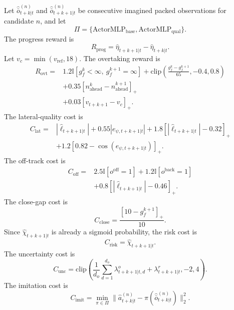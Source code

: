 \documentclass[journal]{IEEEtran}
\begin{document}
Let $\hat{\bar{o}}_{t+k|t}^{(n)}$ and
$\hat{\bar{o}}_{t+k+1|t}^{(n)}$ be consecutive imagined packed
observations for candidate $n$, and let
\begin{equation}
\Pi=
\{
\mathrm{ActorMLP}_{\mathrm{base}},
\mathrm{ActorMLP}_{\mathrm{qual}}
\}.
\end{equation}
The progress reward is
\begin{equation}
R_{\mathrm{prog}}
=
\hat{\eta}_{t+k+1|t}
-
\hat{\eta}_{t+k|t}.
\end{equation}
Let $v_c=\min(v_{\mathrm{ref}},18)$. The overtaking reward is
{\small
\begin{equation}
\begin{aligned}
R_{\mathrm{ovt}}
=
&
1.2
\mathbb{I}[g_f^k<\infty,\ g_f^{k+1}=\infty]
+
\mathrm{clip}
\left(
\frac{g_f^k-g_f^{k+1}}{65},
-0.4,
0.8
\right)
\\
&
+
0.35[n_{\mathrm{ahead}}^k-n_{\mathrm{ahead}}^{k+1}]_+
\\
&
+
0.03[v_{t+k+1}-v_c]_+.
\end{aligned}
\end{equation}
}
The lateral-quality cost is
\begin{equation}
\begin{aligned}
C_{\mathrm{lat}}
=
&
|\hat{\ell}_{t+k+1|t}|
+
0.55|e_{\psi,t+k+1|t}|
+
1.8[|\hat{\ell}_{t+k+1|t}|-0.32]_+
\\
&
+
1.2[0.82-\cos(e_{\psi,t+k+1|t})]_+.
\end{aligned}
\end{equation}
The off-track cost is
\begin{equation}
\begin{aligned}
C_{\mathrm{off}}
= {}&
2.5\mathbb{I}[o^{\mathrm{off}}=1]
+
1.2\mathbb{I}[o^{\mathrm{back}}=1]
\\
&+
0.8[|\hat{\ell}_{t+k+1|t}|-0.46]_+.
\end{aligned}
\end{equation}
The close-gap cost is
\begin{equation}
C_{\mathrm{close}}
=
\frac{[10-g_f^{k+1}]_+}{10}.
\end{equation}
Since $\hat{\chi}_{t+k+1|t}$ is already a sigmoid probability, the risk
cost is
\begin{equation}
C_{\mathrm{risk}}
=
\hat{\chi}_{t+k+1|t}.
\end{equation}
The uncertainty cost is
\begin{equation}
C_{\mathrm{unc}}
=
\mathrm{clip}
\left(
\frac{1}{d_o}
\sum_{d=1}^{d_o}
\lambda_{t+k+1|t,d}^{o}
+
\lambda_{t+k+1|t}^{r},
-2,
4
\right).
\end{equation}
The imitation cost is
\begin{equation}
C_{\mathrm{imit}}
=
\min_{\pi\in\Pi}
\|
\hat a_{t+k|t}^{(n)}
-
\pi(\hat{\bar{o}}_{t+k|t}^{(n)})
\|_2^2.
\end{equation}
\end{document}
